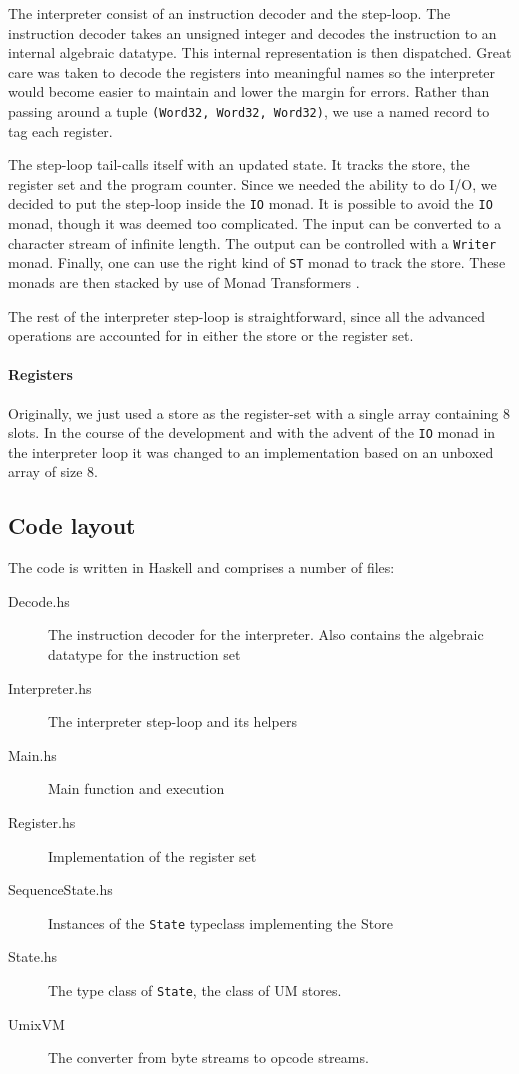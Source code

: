 The interpreter consist of an instruction decoder and the
step-loop. The instruction decoder takes an unsigned integer and
decodes the instruction to an internal algebraic datatype. This
internal representation is then dispatched. Great care was taken to
decode the registers into meaningful names so the interpreter would
become easier to maintain and lower the margin for errors. Rather than
passing around a tuple \texttt{(Word32, Word32, Word32)}, we use a
named record to tag each register.

The step-loop tail-calls itself with an updated state. It tracks the
store, the register set and the program counter. Since we needed the
ability to do I/O, we decided to put the step-loop inside the
\texttt{IO} monad. It is possible to avoid the \texttt{IO}
monad, though it was deemed too complicated. The input can be
converted to a character stream of infinite length. The output can be
controlled with a \texttt{Writer} monad. Finally, one can use the
right kind of \texttt{ST} monad to track the store. These monads are
then stacked by use of Monad Transformers \cite{monad+transformer}.

The rest of the interpreter step-loop is straightforward, since all
the advanced operations are accounted for in either the store or the
register set.

\paragraph{Registers}
\label{sec:registers}

Originally, we just used a store as the register-set with a single
array containing 8 slots. In the course of the development and with
the advent of the \texttt{IO} monad in the interpreter loop it was
changed to an implementation based on an unboxed array of size 8.

\subsection*{Code layout}

The code is written in Haskell and comprises a number of files:
\begin{description}
\item[Decode.hs] The instruction decoder for the interpreter. Also
  contains the algebraic datatype for the instruction set
\item[Interpreter.hs] The interpreter step-loop and its helpers
\item[Main.hs] Main function and execution
\item[Register.hs] Implementation of the register set
\item[SequenceState.hs] Instances of the \texttt{State} typeclass
  implementing the Store
\item[State.hs] The type class of \texttt{State}, the class of UM stores.
\item[UmixVM] The converter from byte streams to opcode streams.
\end{description}
